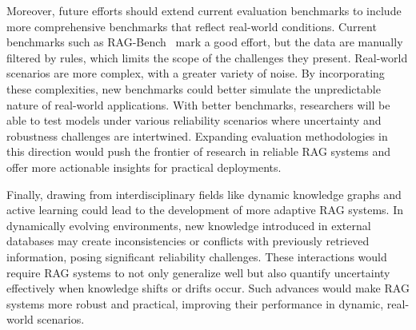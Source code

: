 Moreover, future efforts should extend current evaluation benchmarks to include more comprehensive benchmarks that reflect real-world conditions. Current benchmarks such as RAG-Bench~\cite{adaptive_adversarial_rag_2024} mark a good effort, but the data are manually filtered by rules, which limits the scope of the challenges they present. Real-world scenarios are more complex, with a greater variety of noise. By incorporating these complexities, new benchmarks could better simulate the unpredictable nature of real-world applications. With better benchmarks, researchers will be able to test models under various reliability scenarios where uncertainty and robustness challenges are intertwined. Expanding evaluation methodologies in this direction would push the frontier of research in reliable RAG systems and offer more actionable insights for practical deployments.

Finally, drawing from interdisciplinary fields like dynamic knowledge graphs and active learning could lead to the development of more adaptive RAG systems. In dynamically evolving environments, new knowledge introduced in external databases may create inconsistencies or conflicts with previously retrieved information, posing significant reliability challenges. These interactions would require RAG systems to not only generalize well but also quantify uncertainty effectively when knowledge shifts or drifts occur. Such advances would make RAG systems more robust and practical, improving their performance in dynamic, real-world scenarios.